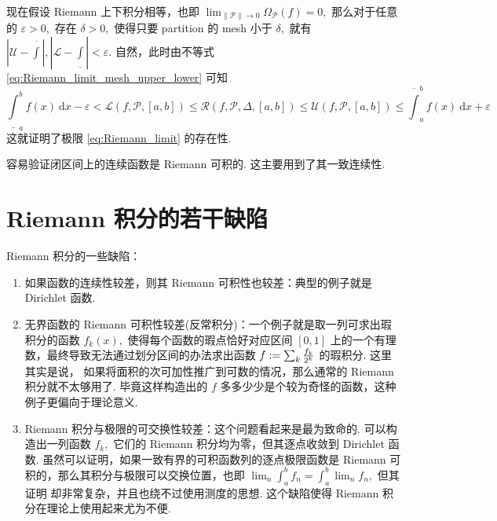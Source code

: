 \documentclass[12pt, a4paper, oneside]{book}
\numberwithin{figure}{section}
\theoremstyle{definition}
\begin{document}
现在假设 Riemann 上下积分相等，也即 $\lim_{\|\mathcal P\|\to 0}\Omega_{\mathcal P}(f)=0,$ 那么对于任意的 $\varepsilon>0,$ 存在 $\delta>0,$  使得只要 partition 的 mesh 小于 $\delta,$ 就有
$|\mathcal U-\overline{\int}|,|\mathcal L-\underline{\int}|< \varepsilon.$ 自然，此时由不等式 \eqref{eq:Riemann_limit_mesh_upper_lower} 可知
\begin{equation}
    \underline{\int}_a^b f(x)\ \mathrm dx-\varepsilon<\mathcal L(f,\mathcal P,[a,b])\leq \mathcal R(f,\mathcal P,\Delta,[a,b])\leq \mathcal U(f,\mathcal P,[a,b])\leq \overline{\int}_a^b f(x)\ \mathrm dx+\varepsilon
\end{equation}
这就证明了极限 \eqref{eq:Riemann_limit} 的存在性.

容易验证闭区间上的连续函数是 Riemann 可积的. 这主要用到了其一致连续性.

\section{Riemann 积分的若干缺陷}\label{sec:deficiencies_of_Riemann_integral}

Riemann 积分的一些缺陷：
\begin{enumerate}
    \item 如果函数的连续性较差，则其 Riemann 可积性也较差：典型的例子就是 Dirichlet 函数.
    \item 无界函数的 Riemann 可积性较差(反常积分)：一个例子就是取一列可求出瑕积分的函数 $f_k(x),$ 使得每个函数的瑕点恰好对应区间 $[0,1]$ 上的一个有理数，最终导致无法通过划分区间的办法求出函数 $f:=\sum_k {f_k\over 2^k}$ 的瑕积分. 这里其实是说，
          如果将面积的次可加性推广到可数的情况，那么通常的 Riemann 积分就不太够用了. 毕竟这样构造出的 $f$ 多多少少是个较为奇怪的函数，这种例子更偏向于理论意义. 
    \item Riemann 积分与极限的可交换性较差：这个问题看起来是最为致命的. 可以构造出一列函数 $f_k,$ 它们的 Riemann 积分均为零，但其逐点收敛到 Dirichlet 函数. 虽然可以证明，如果一致有界的可积函数列的逐点极限函数是 Riemann 可积的，那么其积分与极限可以交换位置，也即 $\lim_{n} \int_a^b f_n = \int_a^b \lim_n f_n,$ 但其证明 
          却非常复杂，并且也绕不过使用测度的思想. 这个缺陷使得 Riemann 积分在理论上使用起来尤为不便. 
\end{enumerate}
\end{document}
